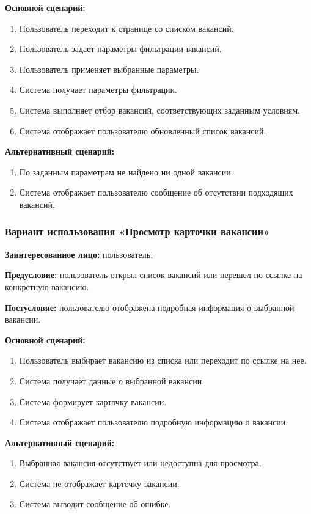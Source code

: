 \textbf{Основной сценарий:}
\begin{enumerate}
	\item Пользователь переходит к странице со списком вакансий.
	\item Пользователь задает параметры фильтрации вакансий.
	\item Пользователь применяет выбранные параметры.
	\item Система получает параметры фильтрации.
	\item Система выполняет отбор вакансий, соответствующих заданным условиям.
	\item Система отображает пользователю обновленный список вакансий.
\end{enumerate}

\textbf{Альтернативный сценарий:}
\begin{enumerate}
	\item По заданным параметрам не найдено ни одной вакансии.
	\item Система отображает пользователю сообщение об отсутствии подходящих вакансий.
\end{enumerate}

\subsubsection{Вариант использования «Просмотр карточки вакансии»}

\textbf{Заинтересованное лицо:} пользователь.

\textbf{Предусловие:} пользователь открыл список вакансий или перешел по ссылке на конкретную вакансию.

\textbf{Постусловие:} пользователю отображена подробная информация о выбранной вакансии.

\textbf{Основной сценарий:}
\begin{enumerate}
	\item Пользователь выбирает вакансию из списка или переходит по ссылке на нее.
	\item Система получает данные о выбранной вакансии.
	\item Система формирует карточку вакансии.
	\item Система отображает пользователю подробную информацию о вакансии.
\end{enumerate}

\textbf{Альтернативный сценарий:}
\begin{enumerate}
	\item Выбранная вакансия отсутствует или недоступна для просмотра.
	\item Система не отображает карточку вакансии.
	\item Система выводит сообщение об ошибке.
\end{enumerate}

